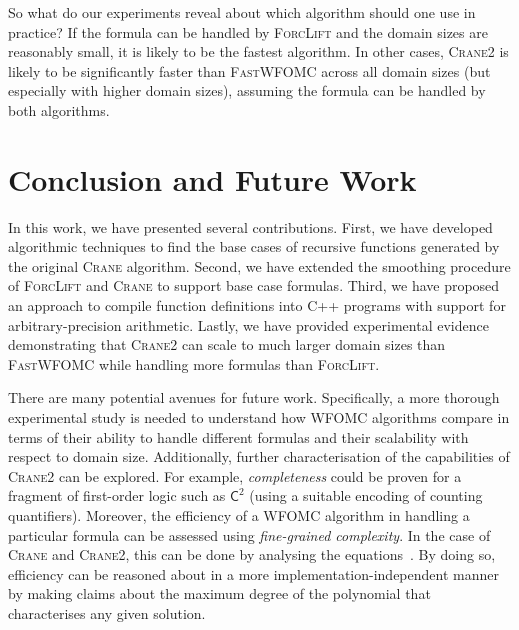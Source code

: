 \documentclass[letterpaper]{article} %
\theoremstyle{remark}
\theoremstyle{definition}
\newcommand{\Ctwo}{$\mathsf{C}^{2}$}
\newcommand{\Cranetwo}{\textsc{Crane2}}
\begin{document}

So what do our experiments reveal about which algorithm should one use in
practice? If the formula can be handled by \textsc{ForcLift} and the domain
sizes are reasonably small, it is likely to be the fastest algorithm. In other
cases, \Cranetwo{} is likely to be significantly faster than \textsc{FastWFOMC}
across all domain sizes (but especially with higher domain sizes), assuming the
formula can be handled by both algorithms.


\section{Conclusion and Future Work}

In this work, we have presented several contributions. First, we have developed
algorithmic techniques to find the base cases of recursive functions generated
by the original \textsc{Crane} algorithm. Second, we have extended the smoothing
procedure of \textsc{ForcLift} and \textsc{Crane} to support base case formulas.
Third, we have proposed an approach to compile function definitions into C++
programs with support for arbitrary-precision arithmetic. Lastly, we have
provided experimental evidence demonstrating that \Cranetwo{} can scale to much
larger domain sizes than \textsc{FastWFOMC} while handling more formulas than
\textsc{ForcLift}.

There are many potential avenues for future work. Specifically, a more thorough
experimental study is needed to understand how WFOMC algorithms compare in terms
of their ability to handle different formulas and their scalability with respect
to domain size. Additionally, further characterisation of the capabilities of
\Cranetwo{} can be explored. For example, \emph{completeness} could be proven
for a fragment of first-order logic such as \Ctwo{} (using a suitable encoding
of counting quantifiers). Moreover, the efficiency of a WFOMC algorithm in
handling a particular formula can be assessed using \emph{fine-grained
  complexity}. In the case of \textsc{Crane} and \Cranetwo{}, this can be done
by analysing the equations~\cite{DBLP:conf/kr/DilkasB23}. By doing so,
efficiency can be reasoned about in a more implementation-independent manner by
making claims about the maximum degree of the polynomial that characterises any
given solution.


\end{document}
